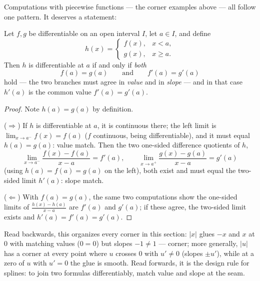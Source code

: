 \documentclass[11pt]{report}
\begin{document}
Computations with piecewise functions --- the corner examples above --- all follow one pattern. It deserves a statement:

\begin{propbox}
Let $f, g$ be differentiable on an open interval $I$, let $a \in I$, and define
\[
h(x) = \begin{cases} f(x), & x < a, \\ g(x), & x \geq a. \end{cases}
\]
Then $h$ is differentiable at $a$ if and only if \emph{both}
\[
f(a) = g(a) \qquad \text{and} \qquad f'(a) = g'(a)
\]
hold --- the two branches must agree in \emph{value} and in \emph{slope} --- and in that case $h'(a)$ is the common value $f'(a) = g'(a)$.
\end{propbox}

\begin{proof}
Note $h(a) = g(a)$ by definition.

($\Rightarrow$) If $h$ is differentiable at $a$, it is continuous there; the left limit is $\lim_{x \to a^-} f(x) = f(a)$ ($f$ continuous, being differentiable), and it must equal $h(a) = g(a)$: value match. Then the two one-sided difference quotients of $h$,
\[
\lim_{x \to a^-} \frac{f(x) - f(a)}{x - a} = f'(a), \qquad
\lim_{x \to a^+} \frac{g(x) - g(a)}{x - a} = g'(a)
\]
(using $h(a) = f(a) = g(a)$ on the left), both exist and must equal the two-sided limit $h'(a)$: slope match.

($\Leftarrow$) With $f(a) = g(a)$, the same two computations show the one-sided limits of $\tfrac{h(x)-h(a)}{x-a}$ are $f'(a)$ and $g'(a)$; if these agree, the two-sided limit exists and $h'(a) = f'(a) = g'(a)$.
\end{proof}

\begin{rembox}
Read backwards, this organizes every corner in this section: $|x|$ glues $-x$ and $x$ at $0$ with matching values ($0 = 0$) but slopes $-1 \neq 1$ --- corner; more generally, $|u|$ has a corner at every point where $u$ crosses $0$ with $u' \neq 0$ (slopes $\pm u'$), while at a zero of $u$ with $u' = 0$ the glue is smooth. Read forwards, it is the design rule for splines: to join two formulas differentiably, match value and slope at the seam.
\end{rembox}

\end{document}
